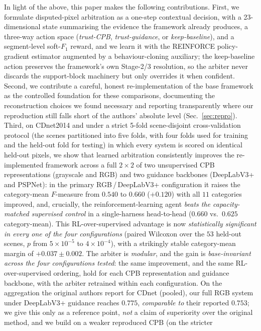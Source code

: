 \documentclass[sn-basic]{sn-jnl}
\newcommand{\Fm}{$F$-measure}
\begin{document}
In light of the above, this paper makes the following contributions. First, we
formulate disputed-pixel arbitration as a one-step contextual decision, with a
23-dimensional state summarising the evidence the framework already produces, a
three-way action space (\emph{trust-CPB}, \emph{trust-guidance}, or
\emph{keep-baseline}), and a segment-level soft-$F_1$ reward, and we learn it with
the REINFORCE policy-gradient estimator augmented by a behaviour-cloning auxiliary;
the keep-baseline action preserves the framework's own Stage-2/3 resolution, so the
arbiter never discards the support-block machinery but only overrides it when
confident. Second, we contribute a careful, honest re-implementation of the base
framework as the controlled foundation for these comparisons, documenting the
reconstruction choices we found necessary and reporting transparently where our
reproduction still falls short of the authors' absolute level (Sec.~\ref{sec:repro}).
Third, on
CDnet2014 and under a strict 5-fold scene-disjoint cross-validation protocol (the
scenes partitioned into five folds, with four folds used for training and the held-out
fold for testing) in which every
system is scored on identical held-out pixels, we show that learned arbitration
consistently improves the re-implemented framework across a full $2\times2$ of two
unsupervised CPB representations (grayscale and RGB) and two guidance backbones
(DeepLabV3+ and PSPNet): in the primary RGB\,/\,DeepLabV3+ configuration it raises the
category-mean \Fm{} from $0.540$ to $0.660$ ($+0.120$) with all $11$ categories
improved, and, crucially, the reinforcement-learning agent \emph{beats the
capacity-matched supervised control} in a single-harness head-to-head ($0.660$ vs.\
$0.625$ category-mean). This RL-over-supervised advantage is now \emph{statistically
significant in every one of the four configurations} (paired Wilcoxon over the $53$
held-out scenes, $p$ from $5\times10^{-5}$ to $4\times10^{-4}$), with a strikingly
stable category-mean margin of $+0.037\pm0.002$. The arbiter is \emph{modular}, and the
gain is \emph{base-invariant across the four configurations tested}: the same
improvement, and the same RL-over-supervised ordering, hold for each CPB representation
and guidance backbone, with the arbiter retrained within each configuration.
On the aggregation the original authors report for CDnet (pooled), our full RGB system
under DeepLabV3+ guidance reaches $0.775$, \emph{comparable to} their reported $0.753$;
we give this only as a reference point, \emph{not} a claim of superiority over the
original method, and we build on a weaker reproduced CPB (on the stricter
\end{document}
